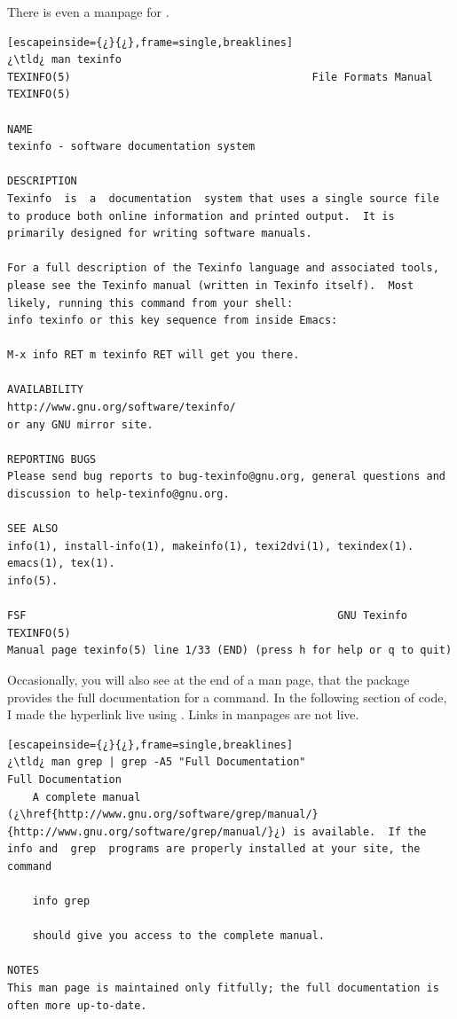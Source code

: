 There is even a manpage for .

\begin{lstlisting}[escapeinside={¿}{¿},frame=single,breaklines]
¿\tld¿ man texinfo
TEXINFO(5)                                      File Formats Manual                                     TEXINFO(5)

NAME
texinfo - software documentation system

DESCRIPTION
Texinfo  is  a  documentation  system that uses a single source file to produce both online information and printed output.  It is primarily designed for writing software manuals.

For a full description of the Texinfo language and associated tools, please see the Texinfo manual (written in Texinfo itself).  Most likely, running this command from your shell:
info texinfo or this key sequence from inside Emacs:

M-x info RET m texinfo RET will get you there.

AVAILABILITY
http://www.gnu.org/software/texinfo/
or any GNU mirror site.

REPORTING BUGS
Please send bug reports to bug-texinfo@gnu.org, general questions and discussion to help-texinfo@gnu.org.

SEE ALSO
info(1), install-info(1), makeinfo(1), texi2dvi(1), texindex(1).
emacs(1), tex(1).
info(5).

FSF                                                 GNU Texinfo                                         TEXINFO(5)
Manual page texinfo(5) line 1/33 (END) (press h for help or q to quit)
\end{lstlisting}

Occasionally, you will also see at the end of a man page, that the  package provides the full documentation for a command. In the following section of code, I made the hyperlink live using \latex. Links in manpages are not live.

\begin{lstlisting}[escapeinside={¿}{¿},frame=single,breaklines]
¿\tld¿ man grep | grep -A5 "Full Documentation"
Full Documentation
	A complete manual (¿\href{http://www.gnu.org/software/grep/manual/}{http://www.gnu.org/software/grep/manual/}¿) is available.  If the info and  grep  programs are properly installed at your site, the command

	info grep
	
    should give you access to the complete manual.
       
NOTES
This man page is maintained only fitfully; the full documentation is often more up-to-date.
      
\end{lstlisting}

